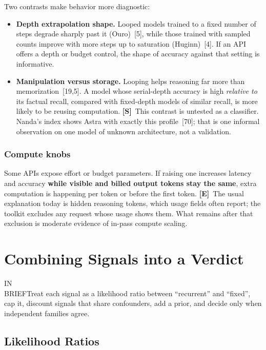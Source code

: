 \documentclass[11pt,letterpaper]{article}
\newcommand{\inbrief}[1]{\begin{inbriefbox}IN\\BRIEF\tcblower #1\end{inbriefbox}}
\newcommand{\mE}{\textcolor{deepindigo}{\textbf{[E]}}}
\newcommand{\mS}{\textcolor{darkamber}{\textbf{[S]}}}
\begin{document}
Two contrasts make behavior more diagnostic:
\begin{itemize}
  \item \textbf{Depth extrapolation shape.} Looped models trained to a fixed number of steps degrade sharply past it (Ouro)~[5], while those trained with sampled counts improve with more steps up to saturation (Huginn)~[4]. If an API offers a depth or budget control, the shape of accuracy against that setting is informative.
  \item \textbf{Manipulation versus storage.} Looping helps reasoning far more than memorization~[19,5]. A model whose serial-depth accuracy is high \emph{relative to} its factual recall, compared with fixed-depth models of similar recall, is more likely to be reusing computation. \mS\ This contrast is untested as a classifier. Nanda's index shows Astra with exactly this profile~[70]; that is one informal observation on one model of unknown architecture, not a validation.
\end{itemize}

\subsubsection{Compute knobs}

Some APIs expose effort or budget parameters. If raising one increases latency and accuracy \textbf{while visible and billed output tokens stay the same}, extra computation is happening per token or before the first token. \mE\ The usual explanation today is hidden reasoning tokens, which usage fields often report; the toolkit excludes any request whose usage shows them. What remains after that exclusion is moderate evidence of in-pass compute scaling.

\section{Combining Signals into a Verdict}
\label{sec:scoring}

\inbrief{Treat each signal as a likelihood ratio between ``recurrent'' and ``fixed'', cap it, discount signals that share confounders, add a prior, and decide only when independent families agree.}

\subsection{Likelihood Ratios}
\label{sec:llr}
\end{document}
